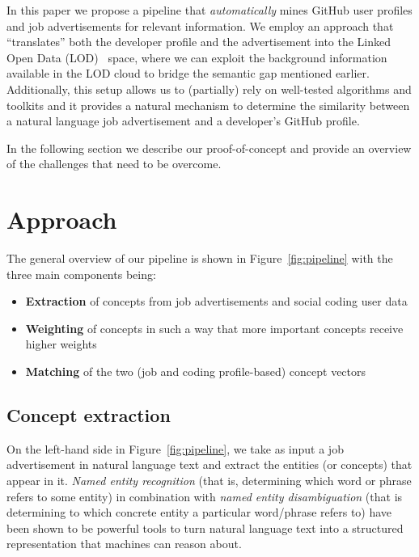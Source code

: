 \documentclass[conference]{IEEEtran}
\begin{document}
In this paper we propose a pipeline that \emph{automatically} mines GitHub user profiles and job advertisements for relevant information. We employ an approach that ``translates'' both the developer profile and the advertisement into the Linked Open Data (LOD)~\cite{bizer2009linked} space, where we can exploit the background information available in the LOD cloud to bridge the semantic gap mentioned earlier. Additionally, this setup allows us to (partially) rely on well-tested algorithms and toolkits and it provides a natural mechanism to determine the similarity between a natural language job advertisement and a developer's GitHub profile. 

In the following section we describe our proof-of-concept and provide an overview of the challenges that need to be overcome.


\section{Approach}

The general overview of our pipeline is shown in Figure~\ref{fig:pipeline} with the three main components being:
\begin{itemize}
	\item \textbf{Extraction} of concepts from job advertisements and social coding user data
	\item \textbf{Weighting} of concepts in such a way that more important concepts receive higher weights
	\item \textbf{Matching} of the two (job and coding profile-based) concept vectors
\end{itemize}

\subsection{Concept extraction}
On the left-hand side in Figure~\ref{fig:pipeline}, we take as input a job advertisement in natural language text and extract the entities (or concepts) that appear in it. \emph{Named entity recognition} (that is, determining which word or phrase refers to some entity) in combination with \emph{named entity disambiguation} (that is determining to which concrete entity a particular word/phrase refers to) have been shown to be powerful tools to turn natural language text into a structured representation that machines can reason about. 
\end{document}
